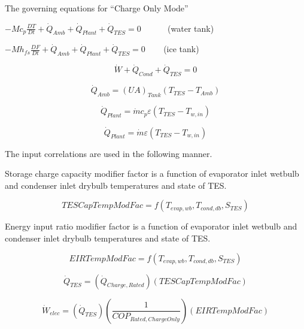 The governing equations for ``Charge Only Mode''

\(- M{c_p}\frac{{DT}}{{Dt}} + {\dot Q_{Amb}} + {\dot Q_{Plant}} + {\dot Q_{TES}} = 0\) ~~~~~ (water tank)

\(- M{h_{fs}}\frac{{DF}}{{Dt}} + {\dot Q_{Amb}} + {\dot Q_{Plant}} + {\dot Q_{TES}} = 0\) ~~~ (ice tank)

\begin{equation}
\dot W + {\dot Q_{Cond}} + {\dot Q_{TES}} = 0
\end{equation}

\begin{equation}
{\dot Q_{Amb}} = {\left( {UA} \right)_{Tank}}\left( {{T_{TES}} - {T_{Amb}}} \right)
\end{equation}

\begin{equation}
  {\dot Q_{Plant}} = \dot m{c_p}\varepsilon \left( {{T_{TES}} - {T_{w,in}}} \right)
\end{equation}

\begin{equation}
  {\dot Q_{Plant}} = \dot m\varepsilon \left( {{T_{TES}} - {T_{w,in}}} \right)
\end{equation}

The input correlations are used in the following manner.

Storage charge capacity modifier factor is a function of evaporator inlet wetbulb and condenser inlet drybulb temperatures and state of TES.

\begin{equation}
TESCapTempModFac = f\left( {{T_{evap,wb}},{T_{cond,db}},{S_{TES}}} \right)
\end{equation}

Energy input ratio modifier factor is a function of evaporator inlet wetbulb and condenser inlet drybulb temperatures and state of TES.

\begin{equation}
EIRTempModFac = f\left( {{T_{evap,wb}},{T_{cond,db}},{S_{TES}}} \right)
\end{equation}

\begin{equation}
{\dot Q_{TES}} = \left( {{{\dot Q}_{Charge,Rated}}} \right)\left( {TESCapTempModFac} \right)
\end{equation}

\begin{equation}
{\dot W_{elec}} = \left( {{{\dot Q}_{TES}}} \right)\left( {\frac{1}{{CO{P_{Rated,ChargeOnly}}}}} \right)\left( {EIRTempModFac} \right)
\end{equation}

